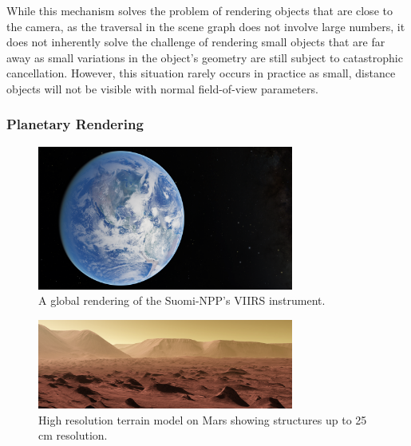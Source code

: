 While this mechanism solves the problem of rendering objects that are close to the camera, as the traversal in the scene graph does not involve large numbers, it does not inherently solve the challenge of rendering small objects that are far away as small variations in the object's geometry are still subject to catastrophic cancellation.  However, this situation rarely occurs in practice as small, distance objects will not be visible with normal field-of-view parameters.



\subsubsection{Planetary Rendering} \label{contributions:astro:gb}
\begin{figure}
\centering
\includegraphics[width=0.75\textwidth]{figures/contributions/gb/earth.png}
\caption{A global rendering of the Suomi-NPP's VIIRS instrument.}
\label{contributions:astro:gb:earth}
\end{figure}

\begin{figure}
\centering
\includegraphics[width=0.75\textwidth]{figures/contributions/gb/mars.png}
\caption{High resolution terrain model on Mars showing structures up to 25\,cm resolution.}
\label{contributions:astro:gb:mars}
\end{figure}

